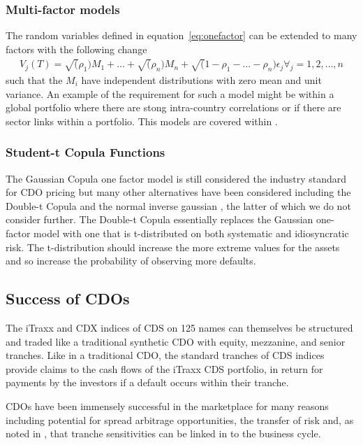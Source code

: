 \subsubsection{Multi-factor models}

The random variables defined in equation~\ref{eq:onefactor} can be extended to many factors with the following change
\begin{align}\label{eq:multifactor}
V_j(T) = \sqrt(\rho_1) M_1 + \ldots + \sqrt(\rho_n) M_n + \sqrt(1-\rho_1 - \ldots - \rho_n ) \epsilon_j			\forall_j = 1, 2, \ldots, n
\end{align}
such that the $M_i$ have independent distributions with zero mean and unit variance.  An example of the requirement for such a model might be within a global portfolio where there are stong intra-country correlations or if there are sector links within a portfolio. This models are covered within \cite{hw2004,Schm2003}.


\subsubsection{Student-t Copula Functions}

The Gaussian Copula one factor model is still considered the industry standard for CDO pricing \cite{Eli2006} but many other alternatives have been considered including the Double-t Copula \cite{hw2004} and the normal inverse gaussian \cite{Neu2007}, the latter of which we do not consider further.  The Double-t Copula essentially replaces the Gaussian one-factor model with one that is t-distributed on both systematic and idiosyncratic risk. The t-distribution should increase the more extreme values for the assets and so increase the probability of observing more defaults.


\subsection{Success of CDOs}

The iTraxx and CDX indices of CDS on 125
names can themselves be structured and traded like a traditional synthetic CDO with
equity, mezzanine, and senior tranches. Like in a traditional CDO, the
standard tranches of CDS indices provide claims to the cash flows of the iTraxx CDS
portfolio, in return for payments by the investors if a default occurs within their tranche. 

CDOs have been immensely successful in the marketplace for many reasons including potential for spread arbitrage opportunities, the transfer of risk and, as noted in \cite{Gib2004}, that tranche sensitivities can be linked in to the business cycle.



